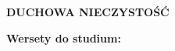 \documentclass[10pt,a4paper,oneside]{article}
\begin{document}
\centerline{\textbf{\MakeUppercase{Duchowa nieczystość}}}
\begin{center}
\textbf{Wersety do studium:} 
\end{center}
\end{document}

